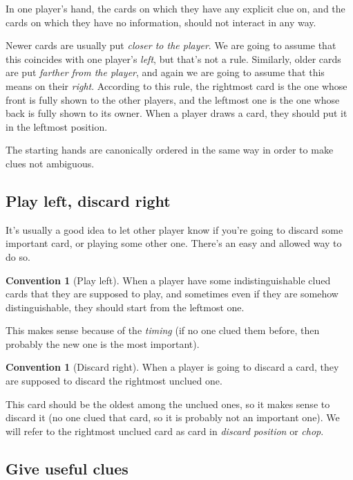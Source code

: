 \documentclass[a4paper]{article}
\theoremstyle{plain}
\theoremstyle{definition}
\newtheorem{convention}[theorem]{Convention}
\begin{document}
In one player's hand, the cards on which they have any explicit clue on, and the cards on which they have no information, should not interact in any way.

Newer cards are usually put \textit{closer to the player}. We are going to assume that this coincides with one player's \textit{left}, but that's not a rule. Similarly, older cards are put \textit{farther from the player}, and again we are going to assume that this means on their \textit{right}. According to this rule, the rightmost card is the one whose front is fully shown to the other players, and the leftmost one is the one whose back is fully shown to its owner. When a player draws a card, they should put it in the leftmost position.

The starting hands are canonically ordered in the same way in order to make clues not ambiguous.

\subsection{Play left, discard right}

It's usually a good idea to let other player know if you're going to discard some important card, or playing some other one. There's an easy and allowed way to do so.

\begin{convention}[Play left]
	\label{play-left}
	When a player have some indistinguishable clued cards that they are supposed to play, and sometimes even if they are somehow distinguishable, they should start from the leftmost one.
\end{convention}

This makes sense because of the \textit{timing} (if no one clued them before, then probably the new one is the most important).

\begin{convention}[Discard right]
	\label{discard-right}
	When a player is going to discard a card, they are supposed to discard the rightmost unclued one.
\end{convention}

This card should be the oldest among the unclued ones, so it makes sense to discard it (no one clued that card, so it is probably not an important one). We will refer to the rightmost unclued card as card in \textit{discard position} or \textit{chop}.

\subsection{Give useful clues}
\end{document}
